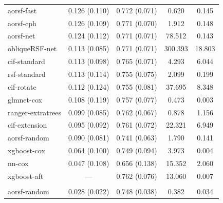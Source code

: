 \documentclass[twoside,11pt]{article}\usepackage[]{graphicx}\usepackage[]{xcolor}
\newenvironment{knitrout}{}{} %
\begin{document}
\begin{knitrout}
\begin{longtable}[t]{lcccc}
\endfoot
\bottomrule
\endlastfoot
\addlinespace[0.3em]
\multicolumn{5}{l}{\textit{\textbf{Overall}}}\\
\hline
\hspace{1em}aorsf-fast & 0.126 (0.110) & 0.772 (0.071) & 0.620 & 0.145\\
\hspace{1em}aorsf-cph & 0.126 (0.109) & 0.771 (0.070) & 1.912 & 0.148\\
\hspace{1em}aorsf-net & 0.124 (0.112) & 0.771 (0.071) & 78.512 & 0.143\\
\hspace{1em}obliqueRSF-net & 0.113 (0.085) & 0.771 (0.071) & 300.393 & 18.803\\
\hspace{1em}cif-standard & 0.113 (0.098) & 0.765 (0.071) & 4.293 & 6.044\\
\hspace{1em}rsf-standard & 0.113 (0.114) & 0.755 (0.075) & 2.099 & 0.199\\
\hspace{1em}cif-rotate & 0.112 (0.124) & 0.755 (0.081) & 37.695 & 8.348\\
\hspace{1em}glmnet-cox & 0.108 (0.119) & 0.757 (0.077) & 0.473 & 0.003\\
\hspace{1em}ranger-extratrees & 0.099 (0.085) & 0.762 (0.067) & 0.878 & 1.156\\
\hspace{1em}cif-extension & 0.095 (0.092) & 0.761 (0.072) & 22.321 & 6.949\\
\hspace{1em}aorsf-random & 0.090 (0.081) & 0.741 (0.063) & 1.790 & 0.141\\
\hspace{1em}xgboost-cox & 0.064 (0.100) & 0.749 (0.094) & 3.973 & 0.004\\
\hspace{1em}nn-cox & 0.047 (0.108) & 0.656 (0.138) & 15.352 & 2.060\\
\hspace{1em}xgboost-aft & --- & 0.762 (0.076) & 13.060 & 0.007\\
\addlinespace[0.3em]
\multicolumn{5}{l}{\textit{\textbf{ACTG 320; AIDS diagnosis, n = 1151, p = 12}}}\\
\hline
\hspace{1em}aorsf-random & 0.028 (0.022) & 0.748 (0.038) & 0.382 & 0.034\\

\end{longtable}
\end{knitrout}
\end{document}
